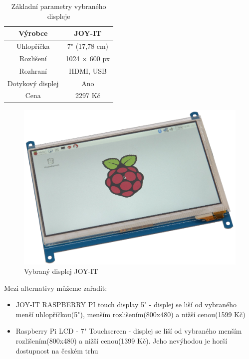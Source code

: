 \begin{table}[!h]
    \centering
    \begin{tabular}{|c|c|}
        \hline
        Výrobce                                                         & JOY-IT   \\ \hline
        Uhlopříčka                                                      & 7" (17,78 cm)  \\ \hline
        Rozlišení                                                        & 1024 × 600 px    \\ \hline
         Rozhraní 
            & HDMI, USB \\ \hline
        Dotykový displej                                                        & Ano     \\ \hline
        Cena                                                            & 2297 Kč     \\ \hline
    \end{tabular}
    \label{displeej}
    \caption{Základní parametry vybraného displeje}
\end{table}



\begin{figure}[!h]
    \begin{center}
        \includegraphics[scale=0.22]{obrazky/Displej.png}
    \end{center}
    \caption{Vybraný displej JOY-IT \cite{displej}}
\end{figure}

Mezi alternativy můžeme zařadit:
\begin{itemize}
    \item JOY-IT RASPBERRY PI touch display 5" - displej se liší od vybraného menší uhlopříčkou(5"), menším rozlišením(800x480) a nižší cenou(1599 Kč)
    \item Raspberry Pi LCD - 7" Touchscreen - displej se liší od vybraného menším rozlišením(800x480) a nižší cenou(1399 Kč). Jeho nevýhodou je horší dostupnost na českém trhu
\end{itemize}


